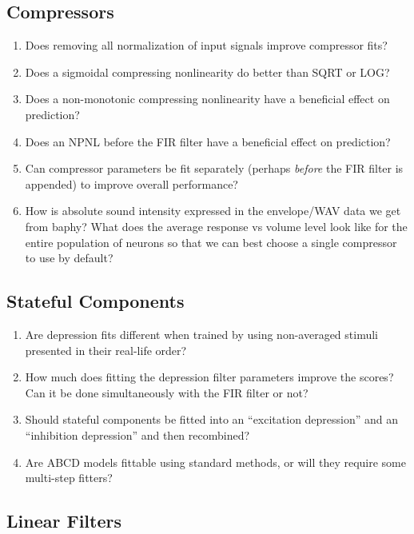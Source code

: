 \documentclass[11pt]{article}
\begin{document}
\subsection{Compressors}
\label{sec-3.3}

\begin{enumerate}
\item Does removing all normalization of input signals improve compressor fits?
\item Does a sigmoidal compressing nonlinearity do better than SQRT or LOG?
\item Does a non-monotonic compressing nonlinearity have a beneficial effect on prediction?
\item Does an NPNL before the FIR filter have a beneficial effect on prediction?
\item Can compressor parameters be fit separately (perhaps \emph{before} the FIR filter is appended) to improve overall performance?
\item How is absolute sound intensity expressed in the envelope/WAV data we get from baphy? What does the average response vs volume level look like for the entire population of neurons so that we can best choose a single compressor to use by default?
\end{enumerate}
  
\subsection{Stateful Components}
\label{sec-3.4}

\begin{enumerate}
\item Are depression fits different when trained by using non-averaged stimuli presented in their real-life order?
\item How much does fitting the depression filter parameters improve the scores? Can it be done simultaneously with the FIR filter or not?
\item Should stateful components be fitted into an ``excitation depression'' and an ``inhibition depression'' and then recombined?
\item Are ABCD models fittable using standard methods, or will they require some multi-step fitters?
\end{enumerate}
\subsection{Linear Filters}
\label{sec-3.5}
\end{document}
